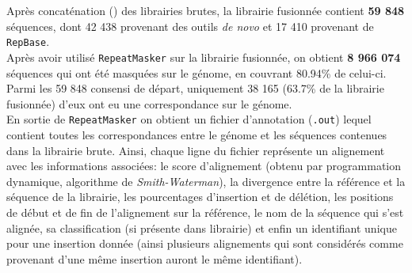 \documentclass[10pt]{article}
\begin{document}
Après concaténation (\figureautorefname{ \ref{fig:pipeline_lib}}) des librairies brutes, la librairie fusionnée contient \textbf{59 848} séquences, dont 42 438 provenant des outils \textit{de novo} et 17 410 provenant de \texttt{RepBase}. \\
Après avoir utilisé \texttt{RepeatMasker} sur la librairie fusionnée, on obtient \textbf{8 966 074} séquences qui ont été masquées sur le génome, en couvrant 80.94\% de celui-ci. \\
Parmi les 59 848 consensi de départ, uniquement 38 165 (63.7\% de la librairie fusionnée) d'eux ont eu une correspondance sur le génome. \\




En sortie de \texttt{RepeatMasker} on obtient un fichier d'annotation (\texttt{.out}) lequel contient toutes les correspondances entre le génome et les séquences contenues dans la librairie brute. Ainsi, chaque ligne du fichier représente un alignement avec les informations associées: le score d'alignement (obtenu par programmation dynamique, algorithme de \textit{Smith-Waterman}), la divergence entre la référence et la séquence de la librairie, les pourcentages d'insertion et de délétion, les positions de début et de fin de l'alignement sur la référence, le nom de la séquence qui s'est alignée, sa classification (si présente dans librairie) et enfin un identifiant unique pour une insertion donnée (ainsi plusieurs alignements qui sont considérés comme provenant d'une même insertion auront le même identifiant). \\
\end{document}
